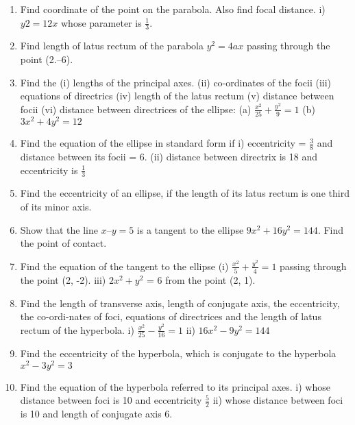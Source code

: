 \documentclass[17pt]{extarticle}
\begin{document}
\begin{multicols}{2}
\begin{enumerate}
\item Find coordinate of the point on the parabola. Also find focal distance. i) $y 2 = 12x$ whose parameter is $\frac{1}{3}$.
 
\item Find length of latus rectum of the parabola $y^2 = 4ax$ passing through the point (2.–6).

\item Find the (i) lengths of the principal axes. (ii) co-ordinates of the focii (iii) equations of directrics (iv) length of the latus rectum (v) distance between focii (vi) distance between directrices of the ellipse: 
(a) $\frac{x^2}{25} + \frac{y^2}{9} = 1$ (b) $3x^2 + 4y^2 = 12$

\item Find the equation of the 		 ellipse in standard form if
i) eccentricity = $\frac{3}{8}$ and distance between its focii = 6.
(ii) distance between directrix is 18 and eccentricity is $\frac{1}{3}$

\item Find the eccentricity of an ellipse, if the length of its latus rectum is one third of its minor axis.

\item Show that the line $x – y = 5$ is a tangent to the ellipse $9x^2 + 16y^2 = 144$. Find the point of contact.

\item Find the equation of the tangent to the ellipse (i) $\frac{x^2}{5} + \frac{y^2}{4} = 1$ passing through the point (2, -2). iii) $2x^2 + y^2$ = 6 from the point (2, 1).

\item Find the length of transverse axis, length of conjugate axis, the eccentricity, the co-ordi-nates of foci, equations of directrices and the
length of latus rectum of the hyperbola. i) $\frac{x^2}{25}-\frac{y^2}{16} = 1$ ii) $16x^2 - 9y^2 = 144$

\item Find the eccentricity of the hyperbola, which is conjugate to the hyperbola $x^2 - 3y^2 = 3$

\item Find the equation of the hyperbola referred to its principal axes. i) whose distance between foci is 10 and eccentricity $\frac{5}{2}$
ii) whose distance between foci is 10 and length of conjugate axis 6.

\end{enumerate} 


\end{multicols}
\end{document}
